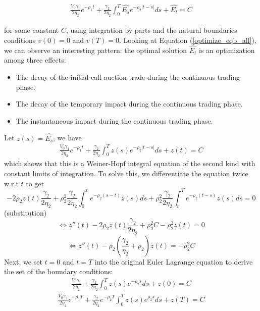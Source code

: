 \documentclass{article}
\begin{document}
\begin{equation}\label{optimize_eqb_all}
  \begin{aligned}
    \frac{V_0 \gamma_1}{2 \eta_2} e^{-\rho_1 t}
    + \frac{\gamma_2}{2 \eta_2} \int_0^T  \hat{E_s} e^{-\rho_2|t-s|} ds
    + \hat{E_t} = C
  \end{aligned}
\end{equation}

for some constant $C$, using integration by parts and the natural boundaries conditions $v(0)=0$ and $v(T)=0$.
Looking at Equation (\ref{optimize_eqb_all}), we can observe an interesting pattern: the optimal solution $\hat{E_t}$ is an optimization among three effects:

\begin{itemize}
  \item The decay of the initial call auction trade during the continuous trading phase.
  \item The decay of the temporary impact during the continuous trading phase.
  \item The instantaneous impact during the continuous trading phase.
\end{itemize}
Let $z(s)=\hat{E_s}$, we have
\[
  \begin{aligned}
    \frac{V_0 \gamma_1}{2 \eta_2} e^{-\rho_1 t}
    + \frac{\gamma_2}{2 \eta_2} \int_0^T  z(s) e^{-\rho_2|t-s|} ds
    + z(t) = C
  \end{aligned}
\]
which shows that this is a Weiner-Hopf integral equation of the second kind with constant limits of integration. To solve this, we differentiate the equation twice w.r.t $t$ to get
\[
  -2 \rho_2 z(t) \frac{\gamma_2}{2 \eta_2} + \rho_2^2 \frac{\gamma_2}{2 \eta_2} \int_0^t e^{-\rho_2(s-t)} z(s) ds + \rho_2^2 \frac{\gamma_2}{2 \eta_2} \int_t^T e^{-\rho_2(t-s)} z(s) ds = 0
\]
(substitution)
\[
  \Leftrightarrow z{''}(t) - 2 \rho_2 z(t) \frac{\gamma_2}{2 \eta_2} + \rho_2^2 C - \rho_2^2 z(t) = 0
\]
\[
  \Leftrightarrow z{''}(t)  - \rho_2\left(\frac{\gamma_2}{\eta_2} + \rho_2 \right) z(t) = -\rho_2^2 C
\]
Next, we set $t=0$ and $t=T$ into the original Euler Lagrange equation to derive the set of the boundary conditions:
\[
  \begin{aligned}
    \frac{V_0 \gamma_1}{2 \eta_2} + \frac{\gamma_2}{2 \eta_2} \int_0^T  z(s) e^{-\rho_2 s} ds + z(0) = C
  \end{aligned}
\]
\[
  \begin{aligned}
    \frac{V_0 \gamma_1}{2 \eta_2} e^{-\rho_1 T} + \frac{\gamma_2}{2 \eta_2} e^{-\rho_2 T}\int_0^T  z(s) e^{\rho_2 s} ds + z(T) = C
  \end{aligned}
\]
\end{document}
